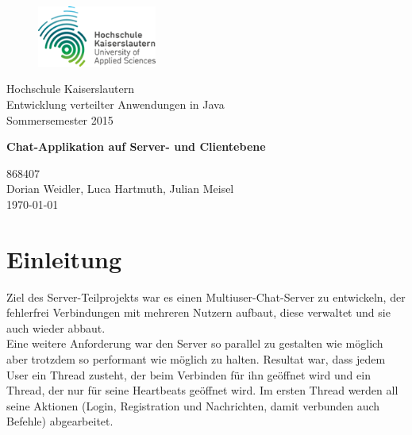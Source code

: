 \documentclass[a4paper,12pt]{scrartcl}
\begin{document}
\begin{titlepage}
\begin{small}
\vfill {
\begin{figure}
 \vspace{-16pt}
 \centering 
 \includegraphics[width=0.35\textwidth]{Bilder/hs_logo.png}
 \vspace{-10pt}
\end{figure}
Hochschule Kaiserslautern\\ 
Entwicklung verteilter Anwendungen in Java\\ 
Sommersemester 2015}
\end{small}


\begin{center}
\begin{Large}
\vfill { \textsf{\textbf{
Chat-Applikation auf Server- und Clientebene
}}}
\end{Large}
\end{center}

\begin{small}
\vfill 868407 \\ Dorian Weidler, Luca Hartmuth, Julian Meisel \\
\today
\end{small}

\end{titlepage}


\tableofcontents
\thispagestyle{empty}

\clearpage

\onehalfspacing

\pagestyle{plain}


\section{Einleitung}
Ziel des Server-Teilprojekts war es einen Multiuser-Chat-Server zu entwickeln, der fehlerfrei Verbindungen mit mehreren Nutzern aufbaut, diese verwaltet und sie auch wieder abbaut.\\

Eine weitere Anforderung war den Server so parallel zu gestalten wie möglich aber trotzdem so performant wie möglich zu halten. Resultat war, dass jedem User ein Thread zusteht, der beim Verbinden für ihn geöffnet wird und ein Thread, der nur für seine Heartbeats geöffnet wird. Im ersten Thread werden all seine Aktionen (Login, Registration und Nachrichten, damit verbunden auch Befehle) abgearbeitet.\\
\end{document}
